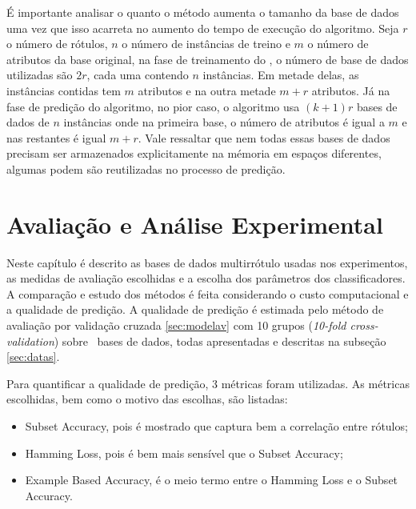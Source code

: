 É importante analisar o quanto o método aumenta o tamanho da base de dados uma vez que isso acarreta no aumento
do tempo de execução do algoritmo. Seja $r$ o número de rótulos, $n$ o número de instâncias de treino
e $m$ o número de atributos da base original, na fase de treinamento do \MRLMa, o número de base de dados utilizadas são
$2r$, cada uma contendo $n$ instâncias. Em metade delas, as instâncias contidas tem $m$ atributos e na outra metade $m+r$ atributos.
Já na fase de predição do algoritmo, no pior caso, o algoritmo usa $(k+1)r$ bases de dados de $n$ instâncias onde na primeira base, o
número de atributos é igual a $m$ e nas restantes é igual $m+r$. Vale ressaltar que nem todas essas bases de dados precisam ser
armazenados explicitamente na mémoria em espaços diferentes, algumas podem são reutilizadas no processo de predição.





\chapter{Avaliação e Análise Experimental}
Neste capítulo é descrito as bases de dados multirrótulo usadas nos experimentos, as medidas de avaliação escolhidas e a escolha
dos parâmetros dos classificadores. 
A comparação e estudo dos métodos é feita considerando o custo computacional e a qualidade de predição.
A qualidade de predição é estimada pelo método de avaliação por validação cruzada \ref{sec:modelav} com 10 grupos
(\textit{10-fold cross-validation}) sobre \Nbases~bases de dados, todas apresentadas e descritas na subseção \ref{sec:datas}.

Para quantificar a qualidade de predição, 3 métricas foram utilizadas. As métricas escolhidas, bem como o motivo das escolhas,
são listadas:
\begin{itemize}
 \item Subset Accuracy, pois é mostrado que captura bem a correlação entre rótulos;
 \item Hamming Loss, pois é bem mais sensível que o Subset Accuracy;
 \item Example Based Accuracy, é o meio termo entre o Hamming Loss e o Subset Accuracy.
\end{itemize}

